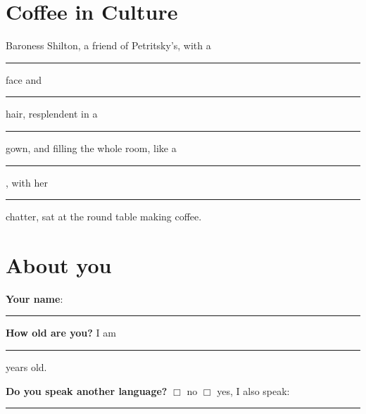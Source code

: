 \documentclass[a4paper,10pt]{article}
\newcommand{\Qq}[1]{\textbf{#1}}
\newcommand{\QO}{$\Box$}%
\newcommand{\Qline}[1]{\noindent\rule{#1}{0.6pt}}
\begin{document}
\section*{Coffee in Culture}

Baroness Shilton, a friend of Petritsky’s, with a \Qline{3cm} face and \Qline{3cm} hair, resplendent in a \Qline{3cm} gown, 
and filling the whole room, like a \Qline{3cm}, with her \Qline{3cm} chatter, sat at the round table making coffee.

\section*{About you}

\Qq{Your name}: \Qline{12cm}

\Qq{How old are you?} I am \Qline{2cm} years old.

\Qq{Do you speak another language?} \hfil \QO{} no \hfil \QO{} yes, I also speak: \Qline{4cm}
\end{document}
